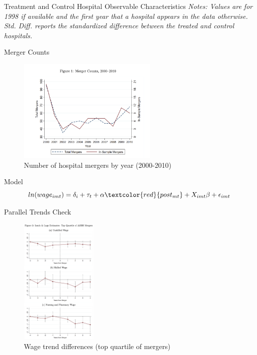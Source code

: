 \documentclass{beamer}
\begin{document}
\begin{frame}{Treatment and Control Hospital Observable Characteristics}
\medskip
\tiny\emph{Notes: Values are for 1998 if available and the first year that a hospital appears in the data otherwise. Std. Diff. reports the standardized difference between the treated and control hospitals.}
\end{frame}

\begin{frame}{Merger Counts}
  \begin{figure}
    \centering
    \includegraphics[width=0.6\textwidth]{merger_counts.png}
    \caption{Number of hospital mergers by year (2000-2010)}
  \end{figure}
\end{frame}

\begin{frame}{Model}
  \begin{equation}
    ln(wage_{imt}) = \delta_i + \tau_t + \alpha \textcolor{red}{post_{mt}} + X_{imt}\beta + \epsilon_{imt}
  \end{equation}
\end{frame}

\begin{frame}{Parallel Trends Check}
  \begin{figure}
    \centering
    \includegraphics[width=0.33\textwidth]{parallel_trends.png}
    \caption{Wage trend differences (top quartile of mergers)}
  \end{figure}
\end{frame}
\end{document}
